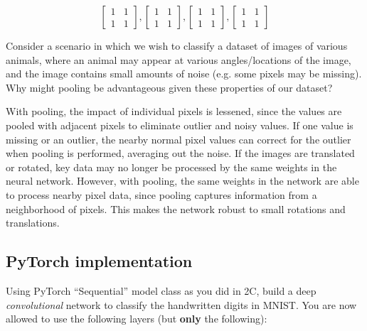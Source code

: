 \begin{solution}
    \[
    \begin{bmatrix}
        1 & 1\\
        1 & 1
    \end{bmatrix},
    \begin{bmatrix}
        1 & 1\\
        1 & 1
    \end{bmatrix},
    \begin{bmatrix}
        1 & 1\\
        1 & 1
    \end{bmatrix},
    \begin{bmatrix}
        1 & 1\\
        1 & 1
    \end{bmatrix}
\]
\end{solution}

\problem[4]

Consider a scenario in which we wish to classify a dataset of images of various animals, where an animal may appear at various angles/locations of the image, and the image contains small amounts of noise (e.g. some pixels may be missing). Why might pooling be advantageous given these properties of our dataset?

\begin{solution}
    With pooling, the impact of individual pixels is lessened, since the values are pooled with adjacent pixels to eliminate outlier and noisy values. If one value is missing or an outlier, the nearby normal pixel values can correct for the outlier when pooling is performed, averaging out the noise. If the images are translated or rotated, key data may no longer be processed by the same weights in the neural network. However, with pooling, the same weights in the network are able to process nearby pixel data, since pooling captures information from a neighborhood of pixels. This makes the network robust to small rotations and translations.
\end{solution}

\newpage

\subsection{PyTorch implementation}
\problem[20]

Using PyTorch ``Sequential'' model class as you did in 2C, build a deep \emph{convolutional}
network to classify the handwritten digits in MNIST. You are now allowed to use
the following layers (but \textbf{only} the following):

